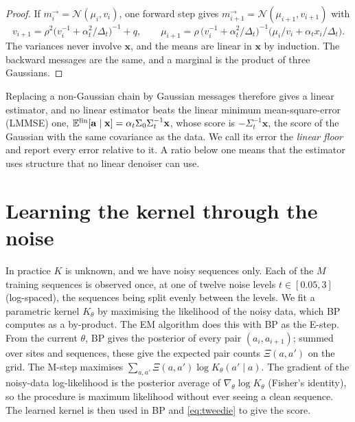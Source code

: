 \documentclass[11pt,a4paper]{article}
\newcommand{\E}{\mathbb{E}}
\newcommand{\N}{\mathcal{N}}
\newcommand{\va}{\mathbf{a}}
\newcommand{\vx}{\mathbf{x}}
\begin{document}
\begin{proof}
If $m^{\rightarrow}_i=\N(\mu_i,v_i)$, one forward step gives $m^{\rightarrow}_{i+1}=\N(\mu_{i+1},v_{i+1})$ with
\[
v_{i+1}=\rho^2\big(v_i^{-1}+\alpha_t^2/\Delta_t\big)^{-1}+q,\qquad
\mu_{i+1}=\rho\,\big(v_i^{-1}+\alpha_t^2/\Delta_t\big)^{-1}\big(\mu_i/v_i+\alpha_t x_i/\Delta_t\big).
\]
The variances never involve $\vx$, and the means are linear in $\vx$ by induction. The backward messages are the same, and a
marginal is the product of three Gaussians.
\end{proof}

Replacing a non-Gaussian chain by Gaussian messages therefore gives a linear estimator, and no linear estimator beats the
linear minimum mean-square-error (LMMSE) one, $\E^{\rm lin}[\va\mid\vx]=\alpha_t\Sigma_0\Sigma_t^{-1}\vx$, whose score is
$-\Sigma_t^{-1}\vx$, the score of the Gaussian with the same covariance as the data. We call its error the \emph{linear floor}
and report every error relative to it. A ratio below one means that the estimator uses structure that no linear denoiser can
use.

\section{Learning the kernel through the noise}
\label{sec:learning}

In practice $K$ is unknown, and we have noisy sequences only. Each of the $M$ training sequences is observed once, at one of
twelve noise levels $t\in[0.05,3]$ (log-spaced), the sequences being split evenly between the levels. We fit a parametric
kernel $K_\theta$ by maximising the likelihood of the noisy data, which BP computes as a by-product. The EM algorithm
\citep{dempster1977maximum} does this with BP as the E-step. From the current $\theta$, BP gives the posterior of every pair
$(a_i,a_{i+1})$; summed over sites and sequences, these give the expected pair counts $\Xi(a,a')$ on the grid. The M-step
maximises $\sum_{a,a'}\Xi(a,a')\log K_\theta(a'\mid a)$. The gradient of the noisy-data log-likelihood is the posterior
average of $\nabla_\theta\log K_\theta$ (Fisher's identity), so the procedure is maximum likelihood without ever seeing a
clean sequence. The learned kernel is then used in BP and \eqref{eq:tweedie} to give the score.
\end{document}
